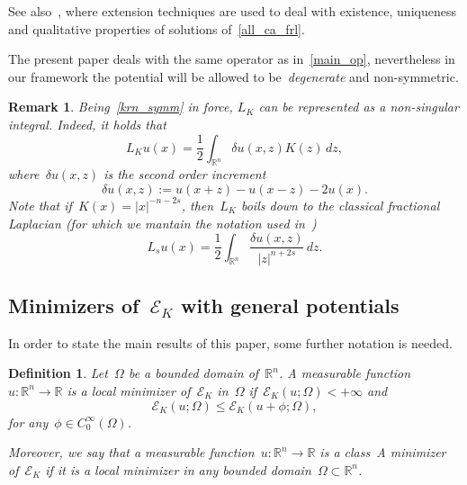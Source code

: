 \documentclass[10pt,a4paper]{amsart}
\newtheorem{defn}[theorem]{Definition}
\newtheorem{rem}[theorem]{Remark}
\numberwithin{equation}{section}
\newcommand{\Rn}{\mathbb{R}^n}
\newcommand{\R}{\mathbb{R}}
\newcommand{\Ec}{\mathcal{E}_K}
\renewcommand{\leqslant}{\leq}
\begin{document}
See also~\cite{CS15}, where extension techniques are used to deal with
existence, uniqueness and qualitative properties of solutions of~\eqref{all_ca_frl}.

The present paper deals with the same operator as in~\eqref{main_op}, nevertheless in our framework the potential will be allowed to be~\textit{degenerate} and non-symmetric.

\begin{rem}
{\rm
Being~\eqref{krn_symm} in force, ${L}_K$ can be represented as a non-singular integral. Indeed, it holds that
\begin{equation*}
{L}_K u(x) = \frac{1}{2} \int_{\R^n} \delta u(x,z) K(z) \, dz,
\end{equation*}
where~$\delta u (x,z)$ is the second order increment
\begin{equation*}
\delta u (x,z) := u(x+z)-u(x-z)-2u(x).
\end{equation*}
Note that if~${K}(x)=|x |^{-n-2s}$, then~${L}_K$ boils down to the classical fractional Laplacian (for which we mantain the notation used in~\cite{DPV15})
\begin{equation*}
L_s u (x)= \frac{1}{2} \int_{\R^n} \frac{\delta u(x,z)}{|z |^{n+2s}} \, dz.
\end{equation*}
}
\end{rem}

   
\subsection{Minimizers of~$\Ec$ with general potentials}\label{S2}
 
In order to state the main results of this paper, some further notation is needed.
  \begin{defn}\label{defini}
  	Let~$\Omega$ be a bounded domain of~$\R^n$. A measurable function~$u : \R^n \to \R$ is a  {\rm local minimizer} of~$\Ec$ in~$\Omega$ if~$\Ec(u;\Omega)<+\infty$ and
  	$$
  	\Ec(u;\Omega) \leqslant\Ec(u+\phi;\Omega),
  	$$
  	for any~$\phi\in C^\infty_0(\Omega)$.
  	
  	Moreover, we say that a measurable function~$u : \Rn \to \R$ is a  {\rm class~A minimizer} of~$\Ec$ if it is a local minimizer in any bounded domain~$\Omega\subset \Rn$.
  \end{defn}
 
\end{document}
